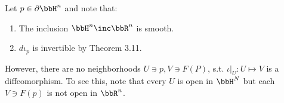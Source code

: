 Let $p \in \partial \bbH^n$ and note that:

\begin{enumerate}[1.]
\item The inclusion $\bbH^n \inc \bbR^n$ is smooth.
\item $d \iota_p$ is invertible by Theorem 3.11.
\end{enumerate}

However, there are no neighborhoods $U \ni p, V \ni F(P)$, s.t. $\iota|_U:U\mapsto V$ is a diffeomorphism.  To see this, note that every $U$ is open in $\bbH^N$ but each $V \ni F(p)$ is not open in $\bbR^n$.
